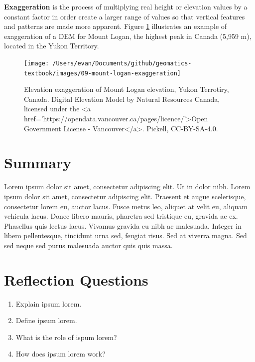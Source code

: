 \documentclass[
]{book}
\providecommand{\tightlist}{%
  \setlength{\itemsep}{0pt}\setlength{\parskip}{0pt}}
\begin{document}
\textbf{Exaggeration} is the process of multiplying real height or elevation values by a constant factor in order create a larger range of values so that vertical features and patterns are made more apparent. Figure \ref{fig:9-mount-logan-exaggeration} illustrates an example of exaggeration of a DEM for Mount Logan, the highest peak in Canada (5,959 m), located in the Yukon Territory.

\begin{figure}
\texttt{[image: /Users/evan/Documents/github/geomatics-textbook/images/09-mount-logan-exaggeration]} \caption{Elevation exaggeration of Mount Logan elevation, Yukon Terrotiry, Canada. Digital Elevation Model by Natural Resources Canada, licensed under the <a href='https://opendata.vancouver.ca/pages/licence/'>Open Government License - Vancouver</a>. Pickell, CC-BY-SA-4.0.}\label{fig:9-mount-logan-exaggeration}
\end{figure}

\hypertarget{summary-7}{%
\section{Summary}\label{summary-7}}

Lorem ipsum dolor sit amet, consectetur adipiscing elit. Ut in dolor nibh. Lorem ipsum dolor sit amet, consectetur adipiscing elit. Praesent et augue scelerisque, consectetur lorem eu, auctor lacus. Fusce metus leo, aliquet at velit eu, aliquam vehicula lacus. Donec libero mauris, pharetra sed tristique eu, gravida ac ex. Phasellus quis lectus lacus. Vivamus gravida eu nibh ac malesuada. Integer in libero pellentesque, tincidunt urna sed, feugiat risus. Sed at viverra magna. Sed sed neque sed purus malesuada auctor quis quis massa.

\hypertarget{reflection-questions-6}{%
\section*{Reflection Questions}\label{reflection-questions-6}}

\begin{enumerate}
\def\labelenumi{\arabic{enumi}.}
\tightlist
\item
  Explain ipsum lorem.
\item
  Define ipsum lorem.
\item
  What is the role of ispum lorem?
\item
  How does ipsum lorem work?
\end{enumerate}
\end{document}
